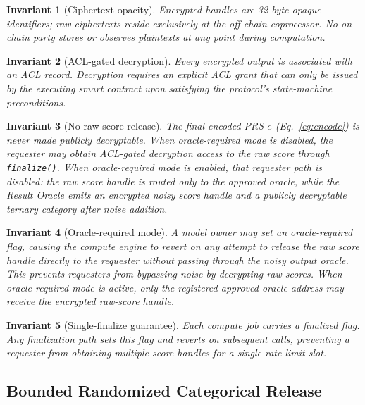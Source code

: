 \documentclass[10pt,twocolumn]{article}
\newtheorem{invariant}{Invariant}
\begin{document}
\begin{invariant}[Ciphertext opacity]
Encrypted handles are 32-byte opaque identifiers; raw ciphertexts reside
exclusively at the off-chain coprocessor.  No on-chain party stores or observes
plaintexts at any point during computation.
\end{invariant}

\begin{invariant}[ACL-gated decryption]
Every encrypted output is associated with an ACL record.  Decryption requires an
explicit ACL grant that can only be issued by the executing smart contract upon
satisfying the protocol's state-machine preconditions.
\end{invariant}

\begin{invariant}[No raw score release]
The final encoded PRS $e$ (Eq.~\ref{eq:encode}) is never made publicly
decryptable.  When oracle-required mode is disabled, the requester may obtain
ACL-gated decryption access to the raw score through \texttt{finalize()}.  When
oracle-required mode is enabled, that requester path is disabled: the raw score
handle is routed only to the approved oracle, while the Result Oracle emits an
encrypted noisy score handle and a publicly decryptable ternary category after
noise addition.
\end{invariant}

\begin{invariant}[Oracle-required mode]
A model owner may set an oracle-required flag, causing the compute engine to revert
on any attempt to release the raw score handle directly to the requester without
passing through the noisy output oracle.  This prevents requesters from bypassing
noise by decrypting raw scores.  When oracle-required mode is active, only the
registered approved oracle address may receive the encrypted raw-score handle.
\end{invariant}

\begin{invariant}[Single-finalize guarantee]
Each compute job carries a finalized flag.  Any finalization path sets this flag
and reverts on subsequent calls, preventing a requester from obtaining multiple
score handles for a single rate-limit slot.
\end{invariant}

\subsection{Bounded Randomized Categorical Release}
\end{document}
